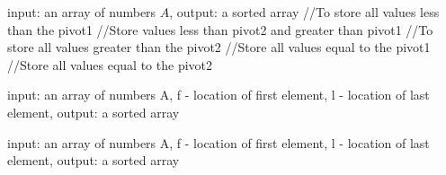 \documentclass{IEEEtran}
\begin{document}
\begin{algorithm}[h!]
    \begin{algorithmic}[1]
         {input:  an array of numbers $A$, output: a sorted array}
              //To store all values less than the pivot1
              //Store values less than pivot2 and greater than pivot1
              //To store all values greater than the pivot2
                //Store all values equal to the pivot1
                //Store all values equal to the pivot2
                \Else{}
                \EndIf
            \EndFor{}  
            \State{} 
 
        \EndFunction{}
    \end{algorithmic}
\end{algorithm}

\begin{algorithm}[h!]
    \begin{algorithmic}[1]
         {input:  an array of numbers A, f - location of first element, l - location of last element, output: a sorted array}
            \EndIf

        \EndFunction{}
    \end{algorithmic}
\end{algorithm}

\begin{algorithm}[h!]
    \begin{algorithmic}[1]
         {input:  an array of numbers A, f - location of first element, l - location of last element, output: a sorted array}
                \EndIf 
            \EndWhile
        \EndFunction{}
    \end{algorithmic}
\end{algorithm}
\end{document}
